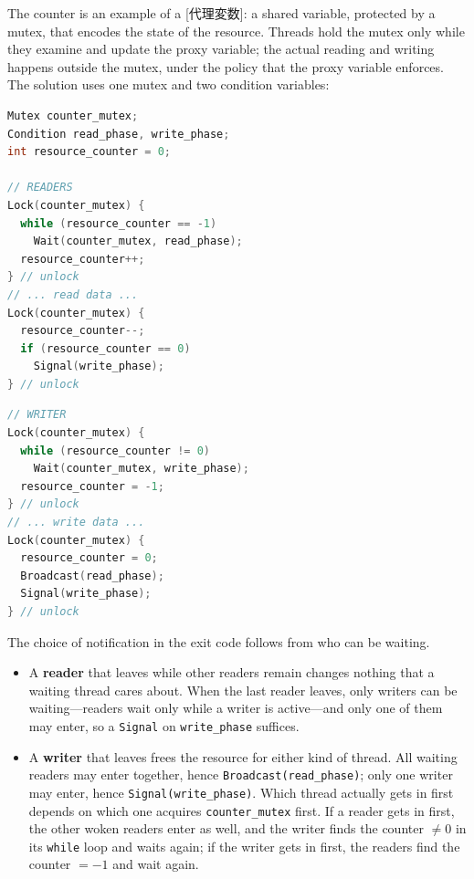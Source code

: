 \documentclass[../main.tex]{subfiles}
\begin{document}
The counter is an example of a [代理変数]: a shared
variable, protected by a mutex, that encodes the state of the resource.
Threads hold the mutex only while they examine and update the proxy
variable; the actual reading and writing happens outside the mutex, under
the policy that the proxy variable enforces.  The solution uses one mutex
and two condition variables:
\begin{lstlisting}[language=C, numbers=none]
Mutex counter_mutex;
Condition read_phase, write_phase;
int resource_counter = 0;

// READERS
Lock(counter_mutex) {
  while (resource_counter == -1)
    Wait(counter_mutex, read_phase);
  resource_counter++;
} // unlock
// ... read data ...
Lock(counter_mutex) {
  resource_counter--;
  if (resource_counter == 0)
    Signal(write_phase);
} // unlock
\end{lstlisting}
\begin{lstlisting}[language=C, numbers=none]
// WRITER
Lock(counter_mutex) {
  while (resource_counter != 0)
    Wait(counter_mutex, write_phase);
  resource_counter = -1;
} // unlock
// ... write data ...
Lock(counter_mutex) {
  resource_counter = 0;
  Broadcast(read_phase);
  Signal(write_phase);
} // unlock
\end{lstlisting}

The choice of notification in the exit code follows from who can be
waiting.
\begin{itemize}
  \item A \textbf{reader} that leaves while other readers remain changes
    nothing that a waiting thread cares about.  When the last reader leaves,
    only writers can be waiting---readers wait only while a writer is
    active---and only one of them may enter, so a \texttt{Signal} on
    \texttt{write\_phase} suffices.
  \item A \textbf{writer} that leaves frees the resource for either kind of
    thread.  All waiting readers may enter together, hence
    \texttt{Broadcast(read\_phase)}; only one writer may enter, hence
    \texttt{Signal(write\_phase)}.  Which thread actually gets in first
    depends on which one acquires \texttt{counter\_mutex} first.  If a
    reader gets in first, the other woken readers enter as well, and the
    writer finds the counter $\neq 0$ in its \texttt{while} loop and waits
    again; if the writer gets in first, the readers find the counter
    $=-1$ and wait again.
\end{itemize}
\end{document}
